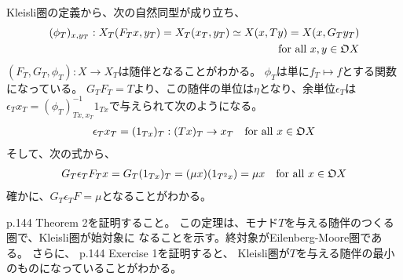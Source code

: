 {	Kleisli圏の定義から、次の自然同型が成り立ち、
	\begin{equation*}\begin{split}
		(\phi_T)_{x,y_T}:
		X_T(F_Tx,y_T) = X_T(x_T,y_T) \simeq X(x,Ty) = X(x,G_Ty_T) \\
		\quad\text{for all } x,y\in{\mathfrak{O}} X
	\end{split}\end{equation*}
	$(F_T,G_T,\phi_T):X\to X_T$は随伴となることがわかる。
	$\phi_T$は単に$f_T\mapsto f$とする関数になっている。
	$G_TF_T=T$より、この随伴の単位は$\eta$となり、余単位$\epsilon_T$は
	$\epsilon_Tx_T=(\phi_T)^{-1}_{Tx,x_T}1_{Tx}$で与えられて次のようになる。
	\begin{equation*}\begin{split}
		\epsilon_Tx_T = (1_{Tx})_T: (Tx)_T\to x_T
		\quad\text{for all } x\in{\mathfrak{O}} X
	\end{split}\end{equation*}
	そして、次の式から、
	\begin{equation*}\begin{split}
		G_T\epsilon_TF_Tx = G_T(1_{Tx})_T = (\mu x)(1_{T^2x}) = \mu x
		\quad\text{for all } x\in{\mathfrak{O}} X
	\end{split}\end{equation*}
	確かに、$G_T\epsilon_TF=\mu$となることがわかる。

	\begin{todo}[定理の証明]\label{todo:定理の証明} %
		\cite{maclane.work} p.144 Theorem 2を証明すること。
		この定理は、モナド$T$を与える随伴のつくる圏で、Kleisli圏が始対象に
		なることを示す。終対象がEilenberg-Moore圏である。
		さらに、\cite{maclane.work} p.144 Exercise 1を証明すると、
		Kleisli圏が$T$を与える随伴の最小のものになっていることがわかる。
	\end{todo} %
%
}\endgroup %
